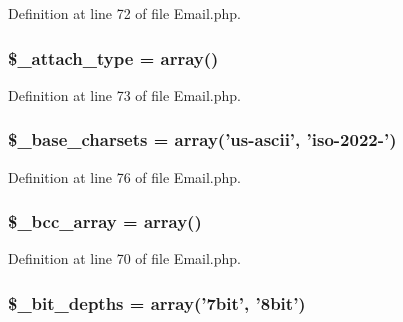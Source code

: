 Definition at line 72 of file Email.\-php.

\hypertarget{class_c_i___email_aab19518d4680c05dea288162e684f0cb}{
\subsubsection[{\$\-\_\-attach\-\_\-type}]{\setlength{\rightskip}{0pt plus 5cm}\$\-\_\-attach\-\_\-type = array()}}\label{class_c_i___email_aab19518d4680c05dea288162e684f0cb}


Definition at line 73 of file Email.\-php.

\hypertarget{class_c_i___email_a212a02e70f089ba2e1a29bd6f45b0691}{
\subsubsection[{\$\-\_\-base\-\_\-charsets}]{\setlength{\rightskip}{0pt plus 5cm}\$\-\_\-base\-\_\-charsets = array('us-\/ascii', 'iso-\/2022-\/')}}\label{class_c_i___email_a212a02e70f089ba2e1a29bd6f45b0691}


Definition at line 76 of file Email.\-php.

\hypertarget{class_c_i___email_a9e55a2ff848d216fa27361d3c66d979d}{
\subsubsection[{\$\-\_\-bcc\-\_\-array}]{\setlength{\rightskip}{0pt plus 5cm}\$\-\_\-bcc\-\_\-array = array()}}\label{class_c_i___email_a9e55a2ff848d216fa27361d3c66d979d}


Definition at line 70 of file Email.\-php.

\hypertarget{class_c_i___email_a65b779b2385490a293d286a135bdf00c}{
\subsubsection[{\$\-\_\-bit\-\_\-depths}]{\setlength{\rightskip}{0pt plus 5cm}\$\-\_\-bit\-\_\-depths = array('7bit', '8bit')}}\label{class_c_i___email_a65b779b2385490a293d286a135bdf00c}


